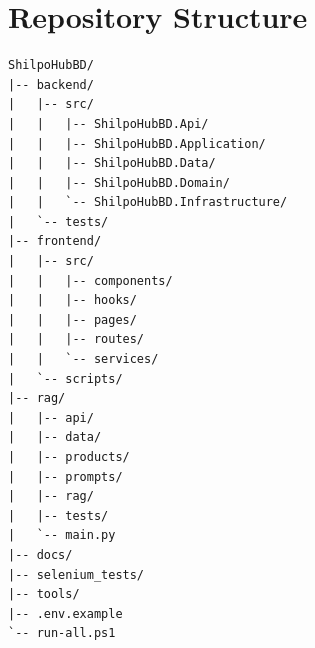\documentclass[12pt,a4paper]{report}
\begin{document}
\chapter{Repository Structure}

\begin{lstlisting}
ShilpoHubBD/
|-- backend/
|   |-- src/
|   |   |-- ShilpoHubBD.Api/
|   |   |-- ShilpoHubBD.Application/
|   |   |-- ShilpoHubBD.Data/
|   |   |-- ShilpoHubBD.Domain/
|   |   `-- ShilpoHubBD.Infrastructure/
|   `-- tests/
|-- frontend/
|   |-- src/
|   |   |-- components/
|   |   |-- hooks/
|   |   |-- pages/
|   |   |-- routes/
|   |   `-- services/
|   `-- scripts/
|-- rag/
|   |-- api/
|   |-- data/
|   |-- products/
|   |-- prompts/
|   |-- rag/
|   |-- tests/
|   `-- main.py
|-- docs/
|-- selenium_tests/
|-- tools/
|-- .env.example
`-- run-all.ps1
\end{lstlisting}
\end{document}
